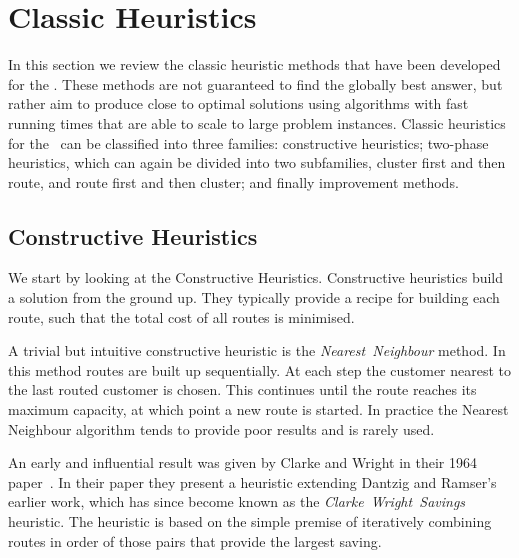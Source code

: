 \section{Classic Heuristics}
\label{sec:ch}

In this section we review the classic heuristic methods that have been developed for the \VRP. These methods are not guaranteed to find the globally best answer, but rather aim to produce close to optimal solutions using algorithms with fast running times that are able to scale to large problem instances. Classic heuristics for the \VRP\ can be classified into three families: constructive heuristics; two-phase heuristics, which can again be divided into two subfamilies, cluster first and then route, and route first and then cluster; and finally improvement methods.

\subsection{Constructive Heuristics}
\label{subsec:conheu}

We start by looking at the Constructive Heuristics. Constructive heuristics build a solution from the ground up. They typically provide a recipe for building each route, such that the total cost of all routes is minimised.

A trivial but intuitive constructive heuristic is the \emph{Nearest~Neighbour} method. In this method routes are built up sequentially. At each step the customer nearest to the last routed customer is chosen. This continues until the route reaches its maximum capacity, at which point a new route is started. In practice the Nearest Neighbour algorithm tends to provide poor results and is rarely used. 
 

An early and influential result was given by Clarke and Wright in their 1964 paper~\cite{clark:1964}. In their paper they present a heuristic extending Dantzig and Ramser's earlier work, which has since become known as the \emph{Clarke~Wright~Savings} heuristic. The heuristic is based on the simple premise of iteratively combining routes in order of those pairs that provide the largest saving. 


